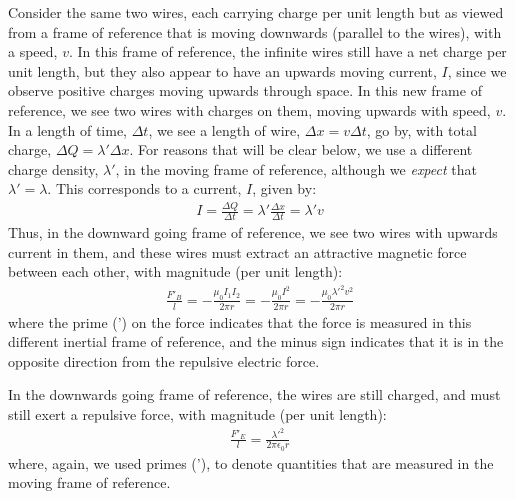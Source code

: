 Consider the same two wires, each carrying charge per unit length but as viewed from a frame of reference that is moving downwards (parallel to the wires), with a speed, $v$. In this frame of reference, the infinite wires still have a net charge per unit length, but they also appear to have an upwards moving current, $I$, since we observe positive charges moving upwards through space.
In this new frame of reference, we see two wires with charges on them, moving upwards with speed, $v$. In a length of time, $\Delta t$, we see a length of wire, $\Delta x=v\Delta t$, go by, with total charge, $\Delta Q=\lambda' \Delta x$. For reasons that will be clear below, we use a different charge density, $\lambda'$, in the moving frame of reference, although we \textit{expect} that $\lambda'=\lambda$. This corresponds to a current, $I$, given by:
\begin{align*}
I=\frac{\Delta Q}{\Delta t}=\lambda'\frac{\Delta x}{\Delta t}=\lambda' v
\end{align*} 
Thus, in the downward going frame of reference, we see two wires with upwards current in them, and these wires must extract an attractive magnetic force between each other, with magnitude (per unit length):
\begin{align*}
\frac{F'_B}{l} = -\frac{\mu_0 I_1I_2}{2\pi r}=-\frac{\mu_0 I^2}{2\pi r}=-\frac{\mu_0 \lambda'^2 v^2}{2\pi r}
\end{align*}
where the prime (') on the force indicates that the force is measured in this different inertial frame of reference, and the minus sign indicates that it is in the opposite direction from the repulsive electric force. 

In the downwards going frame of reference, the wires are still charged, and must still exert a repulsive force, with magnitude (per unit length):
\begin{align*}
\frac{F'_E}{l}=\frac{\lambda'^2}{2\pi \epsilon_0r}
\end{align*}
where, again, we used primes ('), to denote quantities that are measured in the moving frame of reference.

